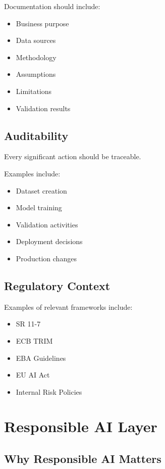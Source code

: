 Documentation should include:

\begin{itemize}
    \item Business purpose
    \item Data sources
    \item Methodology
    \item Assumptions
    \item Limitations
    \item Validation results
\end{itemize}

\subsection{Auditability}

Every significant action should be traceable.

Examples include:

\begin{itemize}
    \item Dataset creation
    \item Model training
    \item Validation activities
    \item Deployment decisions
    \item Production changes
\end{itemize}

\subsection{Regulatory Context}

Examples of relevant frameworks include:

\begin{itemize}
    \item SR 11-7
    \item ECB TRIM
    \item EBA Guidelines
    \item EU AI Act
    \item Internal Risk Policies
\end{itemize}

\section{Responsible AI Layer}

\subsection{Why Responsible AI Matters}

